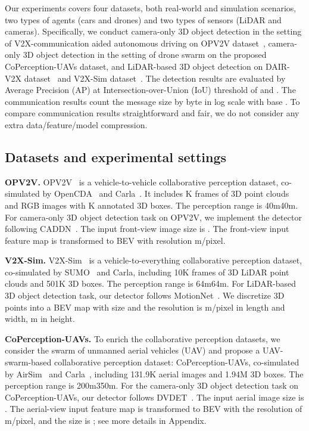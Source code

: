 \documentclass{article}
\begin{document}
Our experiments covers four datasets, both real-world and simulation scenarios, two types of agents (cars and drones) and two types of sensors (LiDAR and cameras). Specifically, we conduct camera-only 3D object detection in the setting of V2X-communication aided autonomous driving on OPV2V dataset~\cite{OPV2V}, camera-only 3D object detection in the setting of drone swarm on the proposed CoPerception-UAVs dataset, and LiDAR-based 3D object detection on DAIR-V2X dataset~\cite{dair} and V2X-Sim dataset~\cite{V2XSim}. The detection results are evaluated by Average Precision (AP) at Intersection-over-Union (IoU) threshold of  and . The communication results count the message size by byte in log scale with base . To compare communication results straightforward and fair, we do not consider any extra data/feature/model compression.

\vspace{-2mm}
\subsection{Datasets and experimental settings}
\label{sec:ExpDetails}
\vspace{-2mm}
\textbf{OPV2V.}
OPV2V~\cite{OPV2V} is a vehicle-to-vehicle collaborative perception dataset, co-simulated by OpenCDA~\cite{OPV2V} and Carla~\cite{carla}. It includes K frames of 3D point clouds and RGB images with K annotated 3D boxes. The perception range is 40m40m. For camera-only 3D object detection task on OPV2V, we implement the detector following CADDN~\cite{CaDDN}. The input front-view image size is . The front-view input feature map is transformed to BEV with resolution m/pixel.


\textbf{V2X-Sim.}
V2X-Sim~\cite{V2XSim} is a vehicle-to-everything collaborative perception dataset, co-simulated by SUMO~\cite{sumo} and Carla, including 10K frames of 3D LiDAR  point clouds and 501K 3D boxes. The perception range is 64m64m. For LiDAR-based 3D object detection task, our detector follows MotionNet~\cite{Wu2020MotionNetJP}. We discretize 3D points into a BEV map with size   and the resolution is m/pixel in length and width, m in height.


\textbf{CoPerception-UAVs.}
To enrich the collaborative perception datasets, we consider the swarm of unmanned aerial vehicles (UAV) and propose a UAV-swarm-based collaborative perception dataset: CoPerception-UAVs, co-simulated by AirSim~\cite{Airsim} and Carla~\cite{carla}, including 131.9K aerial images and 1.94M 3D boxes. The perception range is 200m350m. For the camera-only 3D object detection task on CoPerception-UAVs, our detector follows DVDET~\cite{DVDET}. The input aerial image size is . The aerial-view input feature map is transformed to BEV with the resolution of m/pixel, and the size is ; see more details in Appendix.
\end{document}
